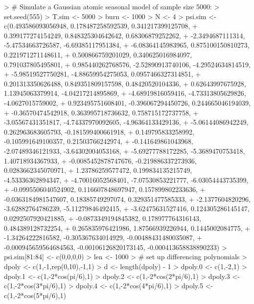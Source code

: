 \documentclass[a4paper]{book}
\begin{document}
\begin{Schunk}
\begin{Sinput}
> # Simulate a Gaussian atomic seasonal model  of sample size 5000:
> set.seed(555)
> T.sim <- 5000
> burn <- 1000
> N <- 4
> psi.sim <- c(0.493586093056948, 0.178487258592539, 0.341217399125708, 
+              0.399177274154249, 0.848325304642642, 0.68306879252262, 
+              -2.3494687111314, -5.47534663726587, -6.69385117951384, 
+              -6.08364145983965, 0.875100150810273, 0.221971271148611, 
+              0.500866759201029, 0.340625016984097, 0.791037805495801, 
+              0.985440262768576, -2.52890913740106, -4.29524634814519, 
+              -5.98519527750281, -4.88659954275053, 0.0957466327314851, 
+              0.201313350626488, 0.849351809157598, 0.48420520104336, 
+              0.62643997675928, 1.13945063379914, -4.04217214895869, 
+              -4.68919816059416, -4.73313805629826, -4.0627015759002,
+              0.923495751608401, -0.396067294450726, 0.244665046194039, 
+              -0.36570474542918, 0.363995718736632, 0.758715172737758, 
+              -3.05567431351817, -4.74337970092605, -4.96364133429136, 
+              -5.06144086942249, 0.262963683605793, -0.181599400661918, 
+              0.149795833258992, -0.105991649100357, 0.21503766242974, 
+              -0.141649861043968, -2.07489346121933, -3.64302004053168, 
+              -5.69277788172285, -5.3689470753418, 1.40718934367933,
+              -0.0085452878747676, -0.219886337273936, 0.0283662345070971,
+              1.23786259577472, 0.199834135215749, -4.53336362894347, 
+              -4.70016052568401, -7.07530853221777, -6.03054443735399, 
+              -0.0995506040524902, 0.116607848697947, 0.157899802233636, 
+              -0.0363184981547607, 0.18385749297074, 0.329351477585333, 
+              -2.1377604820296, -3.62882764786239, -5.11279846492415, 
+              -3.62475631527416, 0.124305286145147, 0.0292507920421885, 
+              -0.0873349194845382, 0.178977764316143, 0.484389128732254,
+              0.265835976421986, 1.87566939226944, 0.1445002084775, 
+              -1.34264222816582, -0.305367634014929, -0.00488431480035087, 
+              -0.000945659564684563, -0.00106126820173145, -0.000413658838890233)
> psi.sim[81:84] <- c(0,0,0,0)
> len <- 1000
> # set up differencing polynomials
> dpoly <- c(1,-1,rep(0,10),-1,1)
> d <- length(dpoly) - 1
> dpoly.0 <- c(1,-2,1)
> dpoly.1 <- c(1,-2*cos(pi/6),1)
> dpoly.2 <- c(1,-2*cos(2*pi/6),1)
> dpoly.3 <- c(1,-2*cos(3*pi/6),1)
> dpoly.4 <- c(1,-2*cos(4*pi/6),1)
> dpoly.5 <- c(1,-2*cos(5*pi/6),1)

\end{Sinput}
\end{Schunk}
\end{document}
